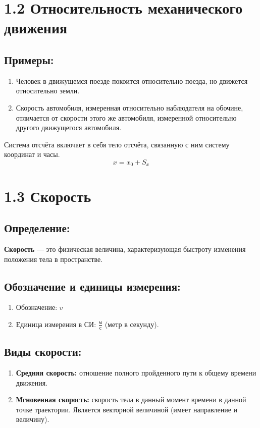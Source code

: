 \documentclass[a4paper,12pt]{article}
\begin{document}
\newpage


\section*{1.2 Относительность механического движения}

\vspace{-9pt}
\subsection*{Примеры:}
\vspace{-3pt}
\begin{enumerate} [itemsep=0pt, topsep=0pt, parsep=3pt]
  \item Человек в движущемся поезде покоится относительно поезда, но движется относительно земли.
  \item Скорость автомобиля, измеренная относительно наблюдателя на обочине, отличается от скорости этого же автомобиля, измеренной относительно другого движущегося автомобиля.
\end{enumerate}
Система отсчёта включает в себя тело отсчёта, связанную с ним систему координат и часы. 
$$ x = x_0 + S_x $$


\section*{1.3 Скорость}

\vspace{-9pt}
\subsection*{Определение:}
\vspace{-3pt}
\textbf{Скорость} — это физическая величина, характеризующая быстроту изменения положения тела в пространстве.
\vspace{-9pt}
\subsection*{Обозначение и единицы измерения:}
\vspace{-3pt}
\begin{enumerate} [itemsep=0pt, topsep=0pt, parsep=3pt]
  \item Обозначение: $v$
  \item Единица измерения в СИ: $\frac{м}{с}$ (метр в секунду).
\end{enumerate}
\vspace{-9pt}
\subsection*{Виды скорости:}
\vspace{-3pt}
\begin{enumerate} [itemsep=0pt, topsep=0pt, parsep=3pt]
  \item \textbf{Средняя скорость:} отношение полного пройденного пути к общему времени движения.
  \item \textbf{Мгновенная скорость:} скорость тела в данный момент времени в данной точке траектории. Является векторной величиной (имеет направление и величину).
\end{enumerate}
\end{document}
